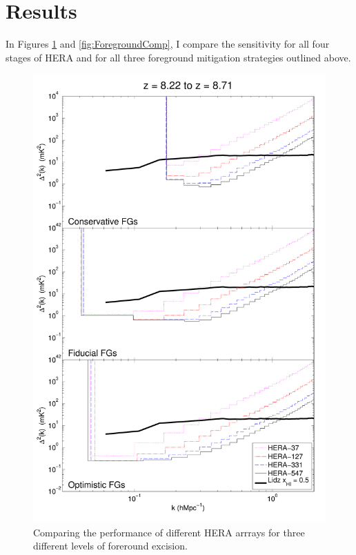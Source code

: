 \documentclass[]{article}
\begin{document}
\section{Results}
In Figures \ref{fig:ArrayComp} and \ref{fig:ForegroundComp}, I compare the sensitivity for all four stages of HERA and for all three foreground mitigation strategies outlined above.

\begin{figure} [!ht] 
	\centering 
	\includegraphics[width=.6\textwidth]{HERA_Array_Comp.pdf}
	\caption{Comparing the performance of different HERA arrrays for three different levels of foreround excision.}
	\label{fig:ArrayComp}
\end{figure} 
\end{document}
